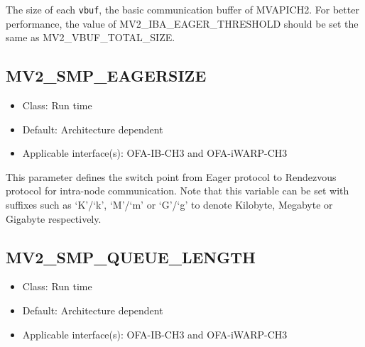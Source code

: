 The size of each \texttt{vbuf}, the basic communication buffer of MVAPICH2.
For better performance, the value of MV2\_IBA\_EAGER\_THRESHOLD should be
set the same as MV2\_VBUF\_TOTAL\_SIZE.

%



\subsection{MV2\_SMP\_EAGERSIZE}
\label{def:smp-eagersize}

\begin{itemize}
    \item Class: Run time
    \item Default: Architecture dependent
    \item Applicable interface(s): OFA-IB-CH3 and OFA-iWARP-CH3
\end{itemize}

This parameter defines the
switch point from Eager protocol to Rendezvous protocol for intra-node
communication. Note that this variable can be set with suffixes such as `K'/`k', `M'/`m' or `G'/`g' 
to denote Kilobyte, Megabyte or Gigabyte respectively.


\subsection{MV2\_SMP\_QUEUE\_LENGTH}
\label{def:smp-queue-length}

\begin{itemize}
    \item Class: Run time

    \item Default: Architecture dependent
    \item Applicable interface(s): OFA-IB-CH3 and OFA-iWARP-CH3
\end{itemize}

